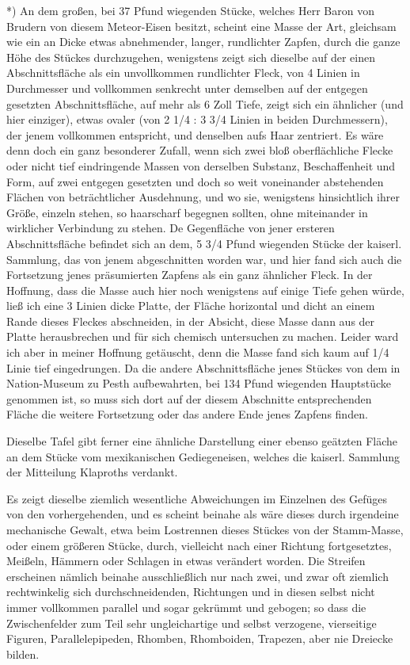 \documentclass[a4paper, 11pt, oneside, german]{article}
\begin{document}
*) An dem großen, bei 37 Pfund wiegenden Stücke, welches Herr Baron von Brudern von diesem Meteor-Eisen besitzt, scheint eine Masse der Art, gleichsam wie ein an Dicke etwas abnehmender, langer, rundlichter Zapfen, durch die ganze Höhe des Stückes durchzugehen, wenigstens zeigt sich dieselbe auf der einen Abschnittsfläche als ein unvollkommen rundlichter Fleck, von 4 Linien in Durchmesser und vollkommen senkrecht unter demselben auf der entgegen gesetzten Abschnittsfläche, auf mehr als 6 Zoll Tiefe, zeigt sich ein ähnlicher (und hier einziger), etwas ovaler (von 2 1/4 : 3 3/4 Linien in beiden Durchmessern), der jenem vollkommen entspricht, und denselben aufs Haar zentriert. Es wäre denn doch ein ganz besonderer Zufall, wenn sich zwei bloß oberflächliche Flecke oder nicht tief eindringende Massen von derselben Substanz, Beschaffenheit und Form, auf zwei entgegen gesetzten und doch so weit voneinander abstehenden Flächen von beträchtlicher Ausdehnung, und wo sie, wenigstens hinsichtlich ihrer Größe, einzeln stehen, so haarscharf begegnen sollten, ohne miteinander in wirklicher Verbindung zu stehen. De Gegenfläche von jener ersteren Abschnittsfläche befindet sich an dem, 5 3/4 Pfund wiegenden Stücke der kaiserl. Sammlung, das von jenem abgeschnitten worden war, und hier fand sich auch die Fortsetzung jenes präsumierten Zapfens als ein ganz ähnlicher Fleck. In der Hoffnung, dass die Masse auch hier noch wenigstens auf einige Tiefe gehen würde, ließ ich eine 3 Linien dicke Platte, der Fläche horizontal und dicht an einem Rande dieses Fleckes abschneiden, in der Absicht, diese Masse dann aus der Platte herausbrechen und für sich chemisch untersuchen zu machen. Leider ward ich aber in meiner Hoffnung getäuscht, denn die Masse fand sich kaum auf 1/4 Linie tief eingedrungen. Da die andere Abschnittsfläche jenes Stückes von dem in Nation-Museum zu Pesth aufbewahrten, bei 134 Pfund wiegenden Hauptstücke genommen ist, so muss sich dort auf der diesem Abschnitte entsprechenden Fläche die weitere Fortsetzung oder das andere Ende jenes Zapfens finden.

Dieselbe Tafel gibt ferner eine ähnliche Darstellung einer ebenso geätzten Fläche an dem Stücke vom mexikanischen Gediegeneisen, welches die kaiserl. Sammlung der Mitteilung Klaproths verdankt.

Es zeigt dieselbe ziemlich wesentliche Abweichungen im Einzelnen des Gefüges von den vorhergehenden, und es scheint beinahe als wäre dieses durch irgendeine mechanische Gewalt, etwa beim Lostrennen dieses Stückes von der Stamm-Masse, oder einem größeren Stücke, durch, vielleicht nach einer Richtung fortgesetztes, Meißeln, Hämmern oder Schlagen in etwas verändert worden. Die Streifen erscheinen nämlich beinahe ausschließlich nur nach zwei, und zwar oft ziemlich rechtwinkelig sich durchschneidenden, Richtungen und in diesen selbst nicht immer vollkommen parallel und sogar gekrümmt und gebogen; so dass die Zwischenfelder zum Teil sehr ungleichartige und selbst verzogene, vierseitige Figuren, Parallelepipeden, Rhomben, Rhomboiden, Trapezen, aber nie Dreiecke bilden.
\end{document}
